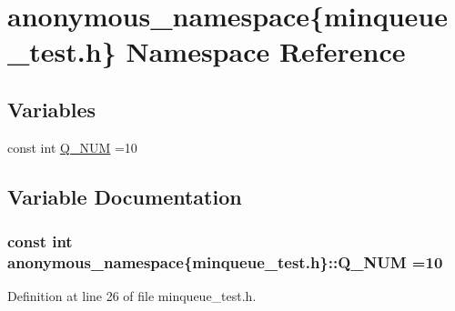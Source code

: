 \hypertarget{namespaceanonymous__namespace_02minqueue__test_8h_03}{}\section{anonymous\+\_\+namespace\{minqueue\+\_\+test.\+h\} Namespace Reference}
\label{namespaceanonymous__namespace_02minqueue__test_8h_03}
\subsection*{Variables}
\begin{DoxyCompactItemize}
\item 
const int \hyperlink{namespaceanonymous__namespace_02minqueue__test_8h_03_abe2fd10b52615354013b4d2480133959}{Q\+\_\+\+N\+U\+M} =10
\end{DoxyCompactItemize}


\subsection{Variable Documentation}
\hypertarget{namespaceanonymous__namespace_02minqueue__test_8h_03_abe2fd10b52615354013b4d2480133959}{}
\subsubsection[{Q\+\_\+\+N\+U\+M}]{\setlength{\rightskip}{0pt plus 5cm}const int anonymous\+\_\+namespace\{minqueue\+\_\+test.\+h\}\+::Q\+\_\+\+N\+U\+M =10}\label{namespaceanonymous__namespace_02minqueue__test_8h_03_abe2fd10b52615354013b4d2480133959}


Definition at line 26 of file minqueue\+\_\+test.\+h.

